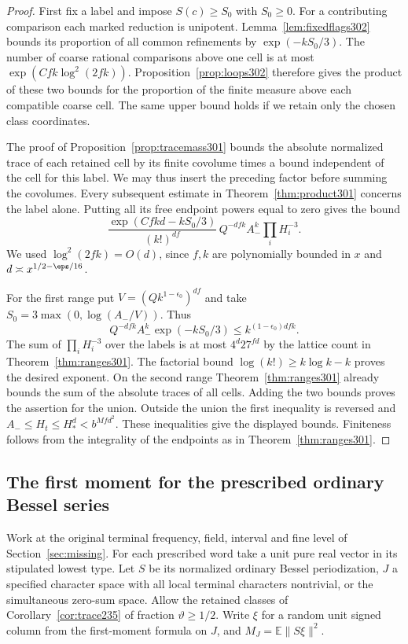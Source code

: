 \documentclass[a4paper,11pt]{article}
\theoremstyle{definition}
\theoremstyle{remark}
\numberwithin{equation}{section}
\begin{document}
\begin{proof}
First fix a label and impose \(S(c)\ge S_0\) with \(S_0\ge0\).
For a contributing comparison each marked reduction is
unipotent. Lemma~\ref{lem:fixedflags302} bounds its proportion
of all common refinements by \(\exp(-kS_0/3)\).
The number of coarse rational comparisons above one cell
is at most \(\exp(Cfk\log^2(2fk))\).
Proposition~\ref{prop:loops302} therefore gives the product
of these two bounds for the proportion of the finite measure
above each compatible coarse cell. The same upper bound
holds if we retain only the chosen class coordinates.

The proof of Proposition~\ref{prop:tracemass301} bounds
the absolute normalized trace of each retained cell by its
finite covolume times a bound independent of the cell for
this label. We may thus insert the preceding factor before
summing the covolumes. Every subsequent estimate in
Theorem~\ref{thm:product301} concerns the label alone.
Putting all its free endpoint powers equal to zero gives
the bound
\[
 \frac{\exp(Cfkd-kS_0/3)}{(k!)^{df}}\,
       Q^{-dfk} A_-^k\prod_i H_i^{-3}.
\]
We used \(\log^2(2fk)=O(d)\), since \(f,k\) are polynomially
bounded in \(x\) and \(d\asymp x^{1/2-\eps/16}\).

For the first range put \(V=(Q k^{1-\epsilon_0})^{df}\) and
take \(S_0=3\max(0,\log(A_-/V))\). Thus
\[
       Q^{-dfk}A_-^k\exp(-kS_0/3)\le k^{(1-\epsilon_0)dfk}.
\]
The sum of \(\prod_i H_i^{-3}\) over the labels is at most
\(4^d27^{fd}\) by the lattice count in
Theorem~\ref{thm:ranges301}. The factorial bound
\(\log(k!)\ge k\log k-k\) proves the desired exponent.
On the second range Theorem~\ref{thm:ranges301} already
bounds the sum of the absolute traces of all cells. Adding
the two bounds proves the assertion for the union.
Outside the union the first inequality is reversed and
\(A_-\le H_t\le H_*^d<b^{Mfd^2}\). These inequalities
give the displayed bounds. Finiteness follows from the
integrality of the endpoints as in Theorem~\ref{thm:ranges301}.
\end{proof}

\subsection{The first moment for the prescribed ordinary Bessel series}\label{nav:VII-61}
Work at the original terminal frequency, field, interval
and fine level of Section~\ref{sec:missing}. For each prescribed word
take a unit pure real vector in its stipulated lowest
type. Let \(S\) be its normalized ordinary Bessel
periodization, \(J\) a specified character space with all
local terminal characters nontrivial, or the simultaneous
zero-sum space. Allow the retained classes of
Corollary~\ref{cor:trace235} of fraction \(\vartheta\ge1/2\).
Write \(\xi\) for a random unit signed column from the
first-moment formula on \(J\), and \(M_J=\mathbb E\|S\xi\|^2\).
\end{document}
